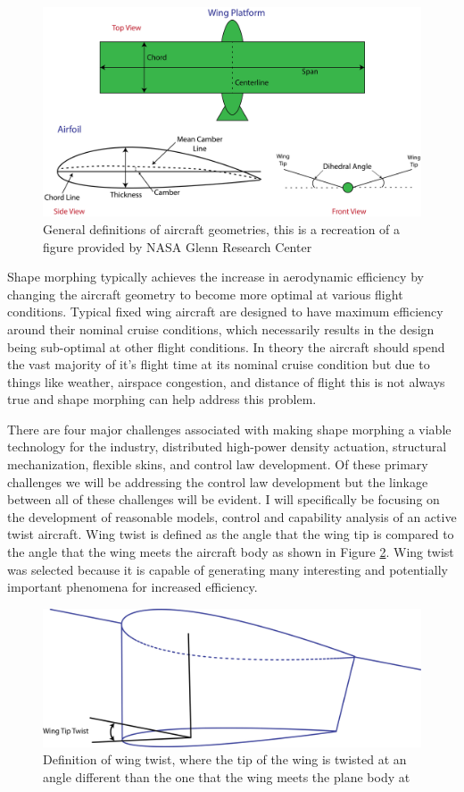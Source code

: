 \documentclass[11pt]{ucthesis}
\begin{document}
\begin{figure}[thpb]
\centering
\includegraphics[width=0.75\linewidth]{./Figures/AirCraftGeometry-01.png}
\caption{General definitions of aircraft geometries, this is a recreation of a figure provided by NASA Glenn Research Center}
\label{fig:airGeo}
\end{figure}

Shape morphing typically achieves the increase in aerodynamic efficiency by changing the aircraft geometry to become more optimal at various flight conditions. Typical fixed wing aircraft are designed to have maximum efficiency around their nominal cruise conditions, which necessarily results in the design being sub-optimal at other flight conditions. In theory the aircraft should spend the vast majority of it's flight time at its nominal cruise condition but due to things like weather, airspace congestion, and distance of flight this is not always true and shape morphing can help address this problem.  

There are four major challenges associated with making shape morphing a viable technology for the industry, distributed high-power density actuation, structural mechanization, flexible skins, and control law development. \cite{reich2007introduction} Of these primary challenges we will be addressing the control law development but the linkage between all of these challenges will be evident. I will specifically be focusing on the development of reasonable models, control and capability analysis of an active twist aircraft. Wing twist is defined as the angle that the wing tip is compared to the angle that the wing meets the aircraft body as shown in Figure \ref{fig:twist}. Wing twist was selected because it is capable of generating many interesting and potentially important phenomena for increased efficiency.

\begin{figure}[thpb]
\centering
\includegraphics[width=0.75\linewidth]{./Figures/WingTipTwist.png}
\caption{Definition of wing twist, where the tip of the wing is twisted at an angle different than the one that the wing meets the plane body at}
\label{fig:twist}
\end{figure}
\end{document}
